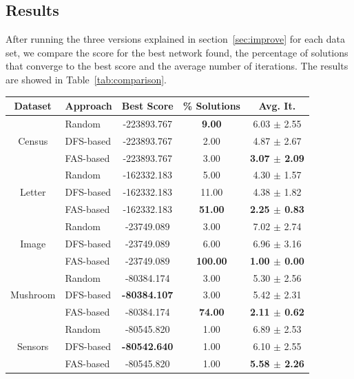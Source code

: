 \subsection{Results}
\label{subsec:results}
	After running the three versions explained in section~\ref{sec:improve} for each data set, we compare the score for the best network found, the percentage of solutions that converge to the best score and the average number of iterations. The results are showed in Table~\ref{tab:comparison}.

	\begin{table}[ h ]
		\centering
		\begin{tabular}{|c|l|c|c|c|}
			\hline
			Dataset & Approach & Best Score & \% Solutions & Avg. It. \\ \hline
			\multirow{3}{*}{Census} & Random & -223893.767 & \textbf{9.00} & 6.03 $\pm$ 2.55 \\ \cline{2-5} 
					& DFS-based & -223893.767 & 2.00 & 4.87 $\pm$ 2.67 \\ \cline{2-5}
					& FAS-based & -223893.767 & 3.00 & \textbf{3.07 $\pm$ 2.09} \\ \hline
			\multirow{3}{*}{Letter} & Random & -162332.183 & 5.00 & 4.30 $\pm$ 1.57 \\ \cline{2-5} 
					& DFS-based & -162332.183 & 11.00 & 4.38 $\pm$ 1.82 \\ \cline{2-5}
					& FAS-based & -162332.183 & \textbf{51.00} & \textbf{2.25 $\pm$ 0.83} \\ \hline
			\multirow{3}{*}{Image} & Random & -23749.089 & 3.00 & 7.02 $\pm$ 2.74 \\ \cline{2-5} 
					& DFS-based & -23749.089 & 6.00 & 6.96 $\pm$ 3.16 \\ \cline{2-5}
					& FAS-based & -23749.089 & \textbf{100.00} & \textbf{1.00 $\pm$ 0.00} \\ \hline
			\multirow{3}{*}{Mushroom} & Random & -80384.174 & 3.00 & 5.30 $\pm$ 2.56 \\ \cline{2-5} 
					& DFS-based & \textbf{-80384.107} & 3.00 & 5.42 $\pm$ 2.31 \\ \cline{2-5}
					& FAS-based & -80384.174 & \textbf{74.00} & \textbf{2.11 $\pm$ 0.62} \\ \hline
			\multirow{3}{*}{Sensors} & Random & -80545.820 & 1.00 & 6.89 $\pm$ 2.53 \\ \cline{2-5} 
					& DFS-based & \textbf{-80542.640} & 1.00 & 6.10 $\pm$ 2.55 \\ \cline{2-5}
					& FAS-based & -80545.820 & 1.00 & \textbf{5.58 $\pm$ 2.26} \\ \hline

\end{tabular}
\end{table}
